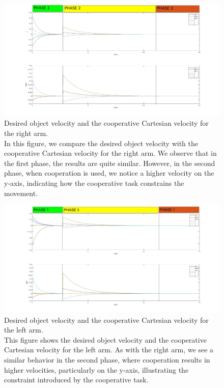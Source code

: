 \documentclass{article}
\begin{document}
\begin{figure}[h]
    \centering
    \includegraphics[width=1\textwidth]{imgs/ex3/desired object velocity and the cooperative Catrisian velocity right .jpg}
    \caption{Desired object velocity and the cooperative Cartesian velocity for the right arm.\\
	In this figure, we compare the desired object velocity with the cooperative Cartesian velocity for the right arm. We observe that in the first phase, the results are quite similar. However, in the second phase, when cooperation is used, we notice a higher velocity on the y-axis, indicating how the cooperative task constrains the movement.
}
\end{figure}

\begin{figure}[h]
    \centering
    \includegraphics[width=1\textwidth]{imgs/ex3/desired object velocity and the cooperative Catrisian velocity left .jpg}
    \caption{Desired object velocity and the cooperative Cartesian velocity for the left arm.\\
	This figure shows the desired object velocity and the cooperative Cartesian velocity for the left arm. As with the right arm, we see a similar behavior in the second phase, where cooperation results in higher velocities, particularly on the y-axis, illustrating the constraint introduced by the cooperative task.
}
\end{figure}

\clearpage
\end{document}
